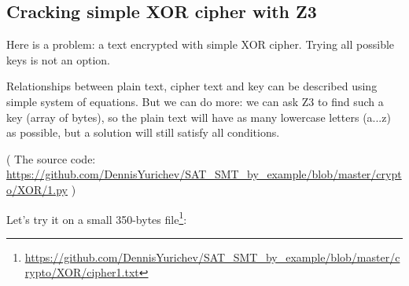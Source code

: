 \subsection{Cracking simple XOR cipher with Z3}
\label{XOR_Z3}

\renewcommand{\CURPATH}{crypto/XOR}

Here is a problem: a text encrypted with simple XOR cipher.
Trying all possible keys is not an option.

Relationships between plain text, cipher text and key can be described using simple system of equations.
But we can do more: we can ask Z3 to find such a key (array of bytes), so the plain text will have as many lowercase
letters (a...z) as possible, but a solution will still satisfy all conditions.



( The source code: \url{https://github.com/DennisYurichev/SAT_SMT_by_example/blob/master/crypto/XOR/1.py} )

Let's try it on a small 350-bytes file\footnote{\url{https://github.com/DennisYurichev/SAT_SMT_by_example/blob/master/crypto/XOR/cipher1.txt}}:

